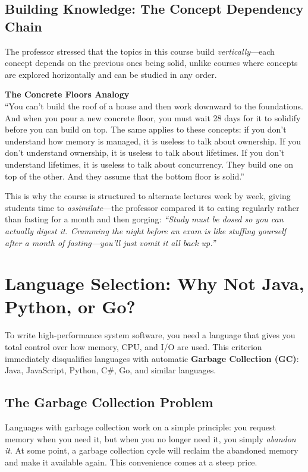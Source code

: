 \subsection{Building Knowledge: The Concept Dependency Chain}

The professor stressed that the topics in this course build \emph{vertically}---each concept depends on the previous ones being solid, unlike courses where concepts are explored horizontally and can be studied in any order.

\begin{insightbox}
\textbf{The Concrete Floors Analogy} \\
``You can't build the roof of a house and then work downward to the foundations. And when you pour a new concrete floor, you must wait 28 days for it to solidify before you can build on top. The same applies to these concepts: if you don't understand how memory is managed, it is useless to talk about ownership. If you don't understand ownership, it is useless to talk about lifetimes. If you don't understand lifetimes, it is useless to talk about concurrency. They build one on top of the other. And they assume that the bottom floor is solid.''
\end{insightbox}

This is why the course is structured to alternate lectures week by week, giving students time to \emph{assimilate}---the professor compared it to eating regularly rather than fasting for a month and then gorging: \emph{``Study must be dosed so you can actually digest it. Cramming the night before an exam is like stuffing yourself after a month of fasting---you'll just vomit it all back up.''}

\section{Language Selection: Why Not Java, Python, or Go?}

To write high-performance system software, you need a language that gives you total control over how memory, CPU, and I/O are used. This criterion immediately disqualifies languages with automatic \textbf{Garbage Collection (GC)}: Java, JavaScript, Python, C\#, Go, and similar languages.

\subsection{The Garbage Collection Problem}

Languages with garbage collection work on a simple principle: you request memory when you need it, but when you no longer need it, you simply \emph{abandon it}. At some point, a garbage collection cycle will reclaim the abandoned memory and make it available again. This convenience comes at a steep price.

